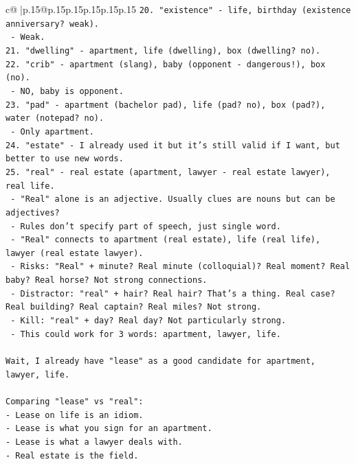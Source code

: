 \documentclass{article}
\begin{document}
{\begin{supertabular}{c@{$\;$}|p{.15\linewidth}@{}p{.15\linewidth}p{.15\linewidth}p{.15\linewidth}p{.15\linewidth}p{.15\linewidth}}
{{{\texttt{20. "existence" {-} life, birthday (existence anniversary? weak).} \\
\texttt{    {-} Weak.} \\
\texttt{21. "dwelling" {-} apartment, life (dwelling), box (dwelling? no).} \\
\texttt{22. "crib" {-} apartment (slang), baby (opponent {-} dangerous!), box (no).} \\
\texttt{    {-} NO, baby is opponent.} \\
\texttt{23. "pad" {-} apartment (bachelor pad), life (pad? no), box (pad?), water (notepad? no).} \\
\texttt{    {-} Only apartment.} \\
\texttt{24. "estate" {-} I already used it but it's still valid if I want, but better to use new words.} \\
\texttt{25. "real" {-} real estate (apartment, lawyer {-} real estate lawyer), real life.} \\
\texttt{    {-} "Real" alone is an adjective. Usually clues are nouns but can be adjectives?} \\
\texttt{    {-} Rules don't specify part of speech, just single word.} \\
\texttt{    {-} "Real" connects to apartment (real estate), life (real life), lawyer (real estate lawyer).} \\
\texttt{    {-} Risks: "Real" + minute? Real minute (colloquial)? Real moment? Real baby? Real horse? Not strong connections.} \\
\texttt{    {-} Distractor: "real" + hair? Real hair? That's a thing. Real case? Real building? Real captain? Real miles? Not strong.} \\
\texttt{    {-} Kill: "real" + day? Real day? Not particularly strong.} \\
\texttt{    {-} This could work for 3 words: apartment, lawyer, life.} \\
\\ 
\texttt{Wait, I already have "lease" as a good candidate for apartment, lawyer, life.} \\
\\ 
\texttt{Comparing "lease" vs "real":} \\
\texttt{{-} Lease on life is an idiom.} \\
\texttt{{-} Lease is what you sign for an apartment.} \\
\texttt{{-} Lease is what a lawyer deals with.} \\
\texttt{{-} Real estate is the field.} \\
}}}
\end{supertabular}}
\end{document}
